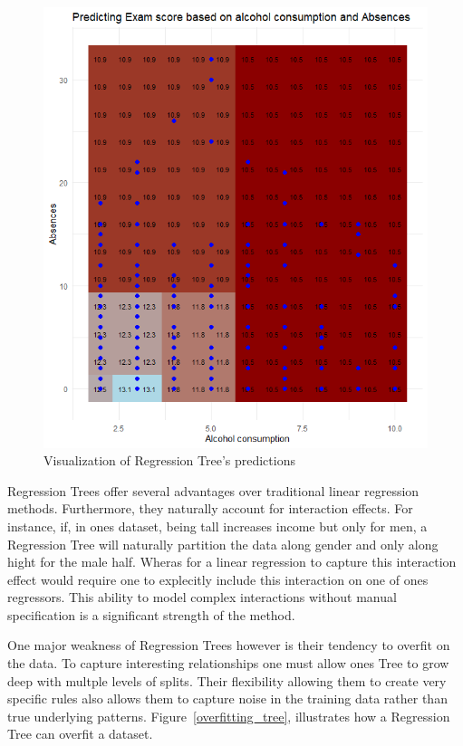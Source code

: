 \documentclass[12pt]{article}
\begin{document}
\begin{figure}
    \includegraphics[scale=0.40]{red_visual.png}
    \caption{Visualization of Regression Tree's predictions}
    \label{red_visual}
\end{figure}

Regression Trees offer several advantages over traditional linear regression methods.  Furthermore, they naturally account for interaction effects. For instance, if, in ones dataset, being tall increases income but only for men, a Regression Tree will naturally partition the data along gender and only along hight for the male half. Wheras for a linear regression to capture this interaction effect would require one to explecitly include this interaction on one of ones regressors. This ability to model complex interactions without manual specification is a significant strength of the method.

One major weakness of Regression Trees however is their tendency to overfit on the data. To capture interesting relationships one must allow ones Tree to grow deep with multple levels of splits. Their flexibility allowing them to create very specific rules also allows them to capture noise in the training data rather than true underlying patterns. Figure~\ref{overfitting_tree}, illustrates how a Regression Tree can overfit a dataset.
\end{document}
